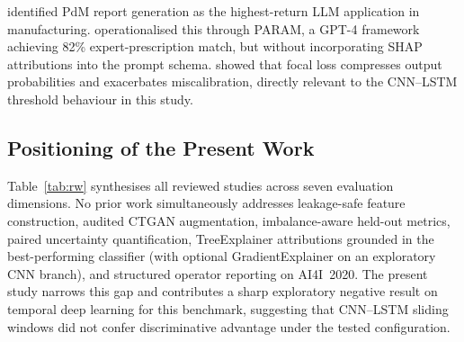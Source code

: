 \documentclass[sensors,article,submit,pdftex,moreauthors]{Definitions/mdpi}
\begin{document}
\citet{ref-llm-industry2025} identified PdM report generation as the
highest-return LLM application in manufacturing.
\citet{ref-llm-maintenance2025} operationalised this through PARAM, a
GPT-4 framework achieving 82\% expert-prescription match, but without
incorporating SHAP attributions into the prompt schema.
\citet{ref-calibration-focal2020} showed that focal loss compresses
output probabilities and exacerbates miscalibration, directly relevant
to the CNN--LSTM threshold behaviour in this study.

\subsection{Positioning of the Present Work}

Table~\ref{tab:rw} synthesises all reviewed studies across seven
evaluation dimensions.
No prior work simultaneously addresses leakage-safe feature
construction, audited CTGAN augmentation, imbalance-aware held-out metrics,
paired uncertainty quantification, TreeExplainer attributions grounded in the
best-performing classifier (with optional GradientExplainer on an exploratory CNN branch),
and structured operator reporting on AI4I~2020.
The present study narrows this gap and contributes a sharp exploratory negative
result on temporal deep learning for this benchmark,
suggesting that CNN--LSTM sliding windows did not confer discriminative advantage
under the tested configuration.
\end{document}
